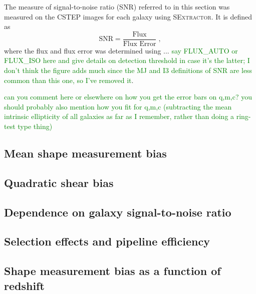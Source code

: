 \documentclass[useAMS,usenatbib]{mn2e}
\newcommand{\green}[1]{\textcolor{green}{#1}}
\begin{document}
The measure of signal-to-noise ratio (SNR) referred to in this section was measured on the CSTEP images
for each galaxy using \textsc{SExtractor}. It is defined as 
\begin{equation}\label{Eqn:SNR_ref}
\textrm{SNR} = \frac{\textrm{Flux}}{\textrm{Flux Error}} \; ,
\end{equation}
where the flux and flux error was determined using ... \green{say FLUX\_AUTO or FLUX\_ISO here and give details on detection threshold in case it's the latter; I don't think the figure adds much since the MJ and I3 definitions of SNR are less common than this one, so I've removed it}.

\green{can you comment here or elsewhere on how you get the error bars on q,m,c? you should probably also mention how you fit for q,m,c (subtracting the mean intrinsic ellipticity of all galaxies as far as I remember, rather than doing a ring-test type thing)}

\subsection{Mean shape measurement bias}


\subsection{Quadratic shear bias}


\subsection{Dependence on galaxy signal-to-noise ratio}\label{sec:SNR}


\subsection{Selection effects and pipeline efficiency}


\subsection{Shape measurement bias as a function of redshift}

\end{document}
